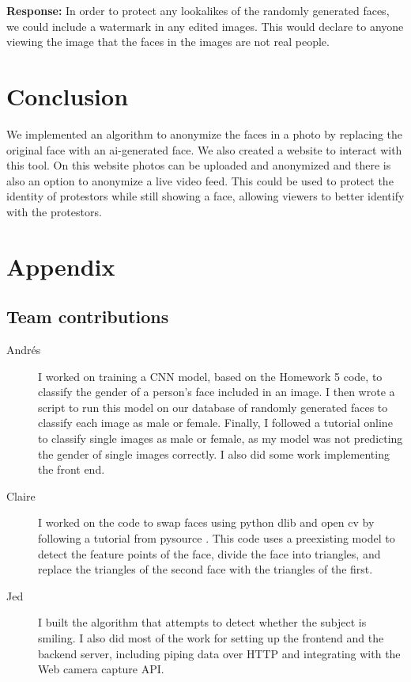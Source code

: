 \begin{enumerate}
    \textbf{Response:} In order to protect any lookalikes of the randomly generated faces, we could include a watermark in any edited images. This would declare to anyone viewing the image
    that the faces in the images are not real people.
\end{enumerate}




\section{Conclusion}

We implemented an algorithm to anonymize the faces in a photo by replacing the original face with an ai-generated face.
We also created a website to interact with this tool. On this website photos can be uploaded and anonymized and there
is also an option to anonymize a live video feed. This could be used to protect the identity of
protestors while still showing a face, allowing viewers to better identify with the protestors.

{\small


}

\section*{Appendix}

\subsection*{Team contributions}

\begin{description}
\item[Andrés] I worked on training a CNN model, based on the Homework 5 code, to classify the gender of a person's face included in an image. I then wrote a script to run this model on our database of randomly generated faces to classify each image as male or female. Finally, I followed a tutorial online to classify single images as male or female, as my model was not predicting the gender of single images correctly. I also did some work implementing the front end.
\item[Claire] I worked on the code to swap faces using python dlib and open cv by following a tutorial from pysource \cite{there_2019}. This code uses a preexisting model to detect the feature points of the face, divide the face into triangles, and replace the triangles of the second face with the triangles of the first.
\item [Jed] I built the algorithm that attempts to detect whether the subject is smiling. I also did most of the work for setting up the frontend and the backend server, including piping data over HTTP and integrating with the Web camera capture API.
\end{description}


